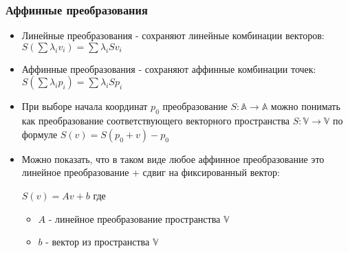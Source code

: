 \documentclass{beamer}
\begin{document}
\begin{frame}[fragile]
\frametitle{Аффинные преобразования}
\begin{itemize}
\item Линейные преобразования - сохраняют линейные комбинации векторов: \begin{math}S \left(\sum \lambda_i v_i\right) = \sum \lambda_i S v_i\end{math}
\pause
\item Аффинные преобразования - сохраняют аффинные комбинации точек: \begin{math}S \left(\sum \lambda_i p_i\right) = \sum \lambda_i S p_i\end{math}
\pause
\item При выборе начала координат \begin{math}p_0\end{math} преобразование \begin{math}S: \mathbb A \rightarrow \mathbb A\end{math} можно понимать как преобразование соответствующего векторного пространства
\begin{math}S: \mathbb V \rightarrow \mathbb V\end{math} по формуле \begin{math}S(v) = S(p_0 + v) - p_0\end{math}
\pause
\item Можно показать, что в таком виде любое аффинное преобразование это линейное преобразование + сдвиг на фиксированный вектор:

\begin{math}S(v) = Av + b\end{math}
где
\begin{itemize}
\item \begin{math}A\end{math} - линейное преобразование пространства \begin{math}\mathbb V\end{math}
\item \begin{math}b\end{math} - вектор из пространства \begin{math}\mathbb V\end{math}
\end{itemize}
\end{itemize}
\end{frame}
\end{document}
